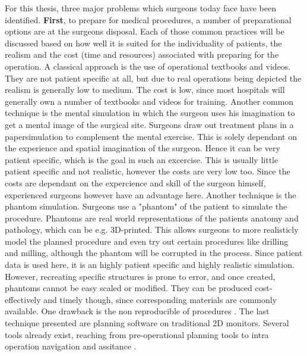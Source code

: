 For this thesis, three major problems which surgeons today face have been identified.
\newline
\textbf{First}, to prepare for medical procedures, a number of preparational options are at the surgeons disposal.
Each of those common practices will be discussed based on how well it is suited for the individuality of patients, the realism and the cost (time and resources) associated with preparing for the operation.
\newline
A classical approach is the use of operational textbooks and videos.
They are not patient specific at all, but due to real operations being depicted the realism is generally low to medium.
The cost is low, since most hospitals will generally own a number of textbooks and videos for training.
\newline
Another common technique is the mental simulation in which the surgeon uses his imagination to get a mental image of the surgical site.
Surgeons draw out treatment plans in a papersimulation to complement the mental exercise.
This is solely dependant on the experience and spatial imagination of the surgeon. 
Hence it can be very patient specific, which is the goal in such an excercise.
This is usually little patient specific and not realistic, however the costs are very low too.
Since the costs are dependant on the expercience and skill of the surgeon himself, experienced surgeons however have an advantage here.
\newline
Another technique is the phantom simulation.
Surgeons use a "phantom" of the patient to simulate the procedure.
Phantoms are real world representations of the patients anatomy and pathology, which can be e.g. 3D-printed.
This allows surgeons to more realisticly model the planned procedure and even try out certain procedures like drilling and milling, although the phantom will be corrupted in the process.
Since patient data is used here, it is an highly patient specific and highly realistic simulation.
However, recreating specific structures is prone to error, and once created, phantoms cannot be easy scaled or modified.
\newline
They can be produced cost-effectively and timely though, since corresponding materials are commonly available.
One drawback is the non reproducible of procedures \cite{richardson2015cost}.
\newline
The last technique presented are planning software on traditional 2D monitors.
Several tools already exist, reaching from pre-operational planning tools to intra operation navigation and assitance \cite{HASSFELD20012}.
